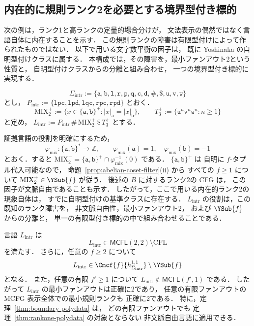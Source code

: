 
\subsection{内在的に規則ランク2を必要とする境界型付き標的}
\label{subsec:intrinsic-ranktwo}

次の例は，ランク1と高ランクの定量的場合分けが，
文法表示の偶然ではなく言語自体に内在することを示す．
この規則ランクの障害は有限型付けによって作られたものではない．
以下で用いる文字数平衡の因子は，
既に Yoshinaka の自明型付けクラスに属する．
本構成では，その障害を，最小ファンアウト2という性質と，
自明型付けクラスからの分離と組み合わせ，
一つの境界型付き標的に実現する．

\[
 \Sigma_{\mathrm{intr}}
 :=\{\mathtt a,\mathtt b,\mathtt l,\mathtt r,\mathtt p,\mathtt q,
       \mathtt c,\mathtt d,\mathtt{\#},\mathtt{\$},
       \mathtt u,\mathtt v,\mathtt w\}
\]
とし，
\(P_{\mathrm{intr}} :=\{\mathtt{lpc},\mathtt{lpd},\mathtt{lqc}, \mathtt{rpc},\mathtt{rpd}\}\)
とおく．
\[
 \mathrm{MIX}_2^+
 :=\{x\in\{\mathtt a,\mathtt b\}^+:
       |x|_{\mathtt a}=|x|_{\mathtt b}\},
 \qquad
 T_3^+
 :=\{\mathtt u^n\mathtt v^n\mathtt w^n:n\ge1\}
\]
と定め，
\(L_{\mathrm{intr}} :=P_{\mathrm{intr}}\,\mathtt{\#}\,\mathrm{MIX}_2^+\, \mathtt{\$}\,T_3^+\)
とする．

証拠言語の役割を明確にするため，
\[
 \varphi_{\mathrm{mix}}:
 \{\mathtt a,\mathtt b\}^*\to\mathbb Z,
 \qquad
 \varphi_{\mathrm{mix}}(\mathtt a)=1,\quad
 \varphi_{\mathrm{mix}}(\mathtt b)=-1
\]
とおく．すると
\(\mathrm{MIX}_2^+ =\{\mathtt a,\mathtt b\}^+ \cap\varphi_{\mathrm{mix}}^{-1}(0)\)
である．
$\{\mathtt a,\mathtt b\}^+$ は
自明に $f$-タプル代入可能なので，
命題~\ref{prop:abelian-coset-filter}(ii) から
すべての $f\ge1$ について
$\mathrm{MIX}_2^+\in\YSub{f}$ が従う．
後述の $B$ に対するランク2の CFG は，
この因子が文脈自由であることも示す．
したがって，ここで用いる内在的ランク2の現象自体は，
すでに自明型付けの基準クラスに存在する．
$L_{\mathrm{intr}}$ の役割は，この既知のランク障害を，
非文脈自由性，最小ファンアウト2，
および $\YSub{f}$ からの分離と，
単一の有限型付き標的の中で組み合わせることである．

\begin{theorem}
\label{thm:intrinsic-ranktwo-witness}
言語 $L_{\mathrm{intr}}$ は
\[
 L_{\mathrm{intr}}
 \in\mathsf{MCFL}(2,2)\setminus\mathrm{CFL}
\]
を満たす．
さらに，任意の $f\ge2$ について
\[
 L_{\mathrm{intr}}
 \in\Cmcf{f}{h_{\Sigma_{\mathrm{intr}}}^{1,1}}
 \setminus\YSub{f}
\]
となる．
また，任意の有限 $f'\ge1$ について
\(L_{\mathrm{intr}}\notin\mathsf{MCFL}(f',1)\)
である．
したがって $L_{\mathrm{intr}}$ の最小ファンアウトは正確に2であり，
任意の有限ファンアウトの MCFG 表示全体での最小規則ランクも
正確に2である．
特に，定理~\ref{thm:boundary-polydata} は，
どの有限ファンアウトでも
定理~\ref{thm:rankone-polydata} の対象とならない
非文脈自由言語に適用できる．
\end{theorem}

